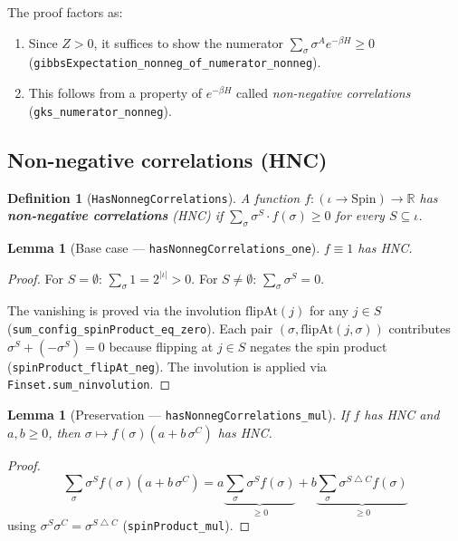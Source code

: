 \documentclass[a4paper,11pt]{article}
\newtheorem{lemma}[theorem]{Lemma}
\newtheorem{definition}[theorem]{Definition}
\begin{document}
The proof factors as:
\begin{enumerate}
  \item Since $Z > 0$, it suffices to show the numerator
    $\sum_\sigma \sigma^A e^{-\beta H} \geq 0$
    (\texttt{gibbsExpectation\_nonneg\_of\_numerator\_nonneg}).
  \item This follows from a property of $e^{-\beta H}$ called
    \emph{non-negative correlations}
    (\texttt{gks\_numerator\_nonneg}).
\end{enumerate}

\subsection{Non-negative correlations (HNC)}

\begin{definition}[\texttt{HasNonnegCorrelations}]
A function $f : (\iota \to \mathrm{Spin}) \to \mathbb{R}$ has
\textbf{non-negative correlations} (HNC) if
$\sum_\sigma \sigma^S \cdot f(\sigma) \geq 0$ for every
$S \subseteq \iota$.
\end{definition}

\begin{lemma}[Base case --- \texttt{hasNonnegCorrelations\_one}]
$f \equiv 1$ has HNC.
\end{lemma}

\begin{proof}
For $S = \emptyset$: $\sum_\sigma 1 = 2^{|\iota|} > 0$.
For $S \neq \emptyset$: $\sum_\sigma \sigma^S = 0$.

The vanishing is proved via the involution
$\mathrm{flipAt}(j)$ for any $j \in S$
(\texttt{sum\_config\_spinProduct\_eq\_zero}).
Each pair $(\sigma, \mathrm{flipAt}(j, \sigma))$ contributes
$\sigma^S + (-\sigma^S) = 0$ because flipping at $j \in S$ negates
the spin product (\texttt{spinProduct\_flipAt\_neg}).
The involution is applied via \texttt{Finset.sum\_ninvolution}.
\end{proof}

\begin{lemma}[Preservation --- \texttt{hasNonnegCorrelations\_mul}]
\label{lem:mul}
If $f$ has HNC and $a, b \geq 0$, then
$\sigma \mapsto f(\sigma)(a + b\,\sigma^C)$ has HNC.
\end{lemma}

\begin{proof}
\[
  \sum_\sigma \sigma^S f(\sigma)(a + b\,\sigma^C)
  = a \underbrace{\sum_\sigma \sigma^S f(\sigma)}_{\geq 0}
  + b \underbrace{\sum_\sigma \sigma^{S \bigtriangleup C} f(\sigma)}_{\geq 0}
\]
using $\sigma^S \sigma^C = \sigma^{S \bigtriangleup C}$
(\texttt{spinProduct\_mul}).
\end{proof}
\end{document}
